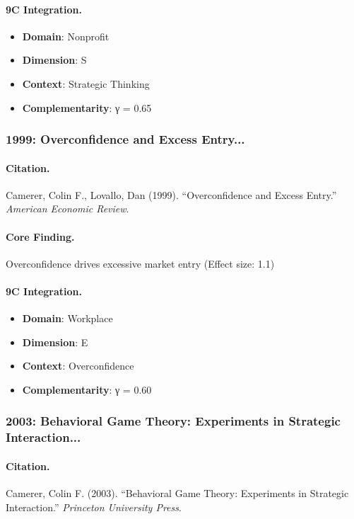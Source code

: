\paragraph{9C Integration.}
\begin{itemize}[nosep]
  \item \textbf{Domain}: Nonprofit
  \item \textbf{Dimension}: S
  \item \textbf{Context}: Strategic Thinking
  \item \textbf{Complementarity}: γ = 0.65
\end{itemize}

\subsubsection{1999: Overconfidence and Excess Entry...}

\paragraph{Citation.}
Camerer, Colin F., Lovallo, Dan (1999). ``Overconfidence and Excess Entry.''
\textit{American Economic Review}.

\paragraph{Core Finding.}
Overconfidence drives excessive market entry (Effect size: 1.1)

\paragraph{9C Integration.}
\begin{itemize}[nosep]
  \item \textbf{Domain}: Workplace
  \item \textbf{Dimension}: E
  \item \textbf{Context}: Overconfidence
  \item \textbf{Complementarity}: γ = 0.60
\end{itemize}

\subsubsection{2003: Behavioral Game Theory: Experiments in Strategic Interaction...}

\paragraph{Citation.}
Camerer, Colin F. (2003). ``Behavioral Game Theory: Experiments in Strategic Interaction.''
\textit{Princeton University Press}.

